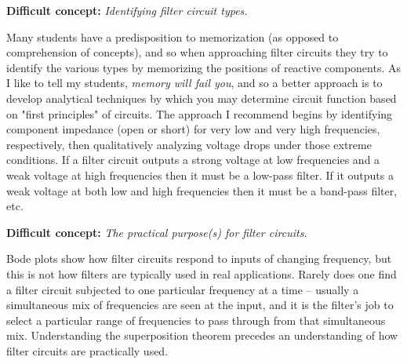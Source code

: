 \vskip 10pt

\noindent
{\bf Difficult concept: } {\it Identifying filter circuit types.}

Many students have a predisposition to memorization (as opposed to comprehension of concepts), and so when approaching filter circuits they try to identify the various types by memorizing the positions of reactive components.  As I like to tell my students, {\it memory will fail you}, and so a better approach is to develop analytical techniques by which you may determine circuit function based on "first principles" of circuits.  The approach I recommend begins by identifying component impedance (open or short) for very low and very high frequencies, respectively, then qualitatively analyzing voltage drops under those extreme conditions.  If a filter circuit outputs a strong voltage at low frequencies and a weak voltage at high frequencies then it must be a low-pass filter.  If it outputs a weak voltage at both low and high frequencies then it must be a band-pass filter, etc.

\vskip 10pt

\noindent
{\bf Difficult concept: } {\it The practical purpose(s) for filter circuits.}

Bode plots show how filter circuits respond to inputs of changing frequency, but this is not how filters are typically used in real applications.  Rarely does one find a filter circuit subjected to one particular frequency at a time -- usually a simultaneous mix of frequencies are seen at the input, and it is the filter's job to select a particular range of frequencies to pass through from that simultaneous mix.  Understanding the superposition theorem precedes an understanding of how filter circuits are practically used.


